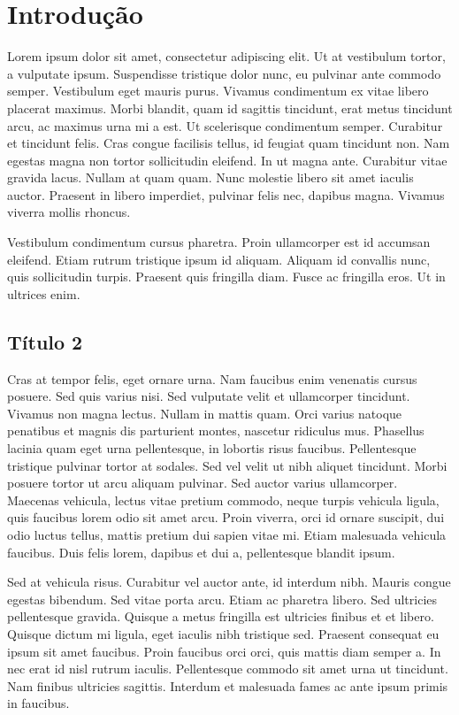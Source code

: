 \section{Introdução}

Lorem ipsum dolor sit amet, consectetur adipiscing elit. Ut at vestibulum tortor, a vulputate ipsum. Suspendisse tristique dolor nunc, eu pulvinar ante commodo semper. Vestibulum eget mauris purus. Vivamus condimentum ex vitae libero placerat maximus. Morbi blandit, quam id sagittis tincidunt, erat metus tincidunt arcu, ac maximus urna mi a est. Ut scelerisque condimentum semper. Curabitur et tincidunt felis. Cras congue facilisis tellus, id feugiat quam tincidunt non. Nam egestas magna non tortor sollicitudin eleifend. In ut magna ante. Curabitur vitae gravida lacus. Nullam at quam quam. Nunc molestie libero sit amet iaculis auctor. Praesent in libero imperdiet, pulvinar felis nec, dapibus magna. Vivamus viverra mollis rhoncus.

Vestibulum condimentum cursus pharetra. Proin ullamcorper est id accumsan eleifend. Etiam rutrum tristique ipsum id aliquam. Aliquam id convallis nunc, quis sollicitudin turpis. Praesent quis fringilla diam. Fusce ac fringilla eros. Ut in ultrices enim.

\subsection{Título 2}

Cras at tempor felis, eget ornare urna. Nam faucibus enim venenatis cursus posuere. Sed quis varius nisi. Sed vulputate velit et ullamcorper tincidunt. Vivamus non magna lectus. Nullam in mattis quam. Orci varius natoque penatibus et magnis dis parturient montes, nascetur ridiculus mus. Phasellus lacinia quam eget urna pellentesque, in lobortis risus faucibus. Pellentesque tristique pulvinar tortor at sodales. Sed vel velit ut nibh aliquet tincidunt. Morbi posuere tortor ut arcu aliquam pulvinar. Sed auctor varius ullamcorper. Maecenas vehicula, lectus vitae pretium commodo, neque turpis vehicula ligula, quis faucibus lorem odio sit amet arcu. Proin viverra, orci id ornare suscipit, dui odio luctus tellus, mattis pretium dui sapien vitae mi. Etiam malesuada vehicula faucibus. Duis felis lorem, dapibus et dui a, pellentesque blandit ipsum.

Sed at vehicula risus. Curabitur vel auctor ante, id interdum nibh. Mauris congue egestas bibendum. Sed vitae porta arcu. Etiam ac pharetra libero. Sed ultricies pellentesque gravida. Quisque a metus fringilla est ultricies finibus et et libero. Quisque dictum mi ligula, eget iaculis nibh tristique sed. Praesent consequat eu ipsum sit amet faucibus. Proin faucibus orci orci, quis mattis diam semper a. In nec erat id nisl rutrum iaculis. Pellentesque commodo sit amet urna ut tincidunt. Nam finibus ultricies sagittis. Interdum et malesuada fames ac ante ipsum primis in faucibus.

